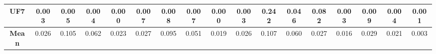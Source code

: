 \begin{table*}[t]
\begin{tabular}{cc|c|c|c|c|c|c|c|c|c|c|c|c|c|c|c}
\multicolumn{1}{c|}{\textbf{UF7}} & 0.003 & 0.005 & 0.004 & 0.000 & 0.007 & 0.008 & 0.007 & 0.000 & 0.003 & 0.242 & 0.046 & 0.082 & 0.003 & 0.009 & 0.004 & 0.001 \\ \hline
\multicolumn{1}{c|}{\textbf{Mean}} & 0.026 & 0.105 & 0.062 & 0.023 & 0.027 & 0.095 & 0.051 & 0.019 & 0.026 & 0.107 & 0.060 & 0.027 & 0.016 & 0.029 & 0.021 & 0.003 \\ \hline
\end{tabular}%
\end{table*}



